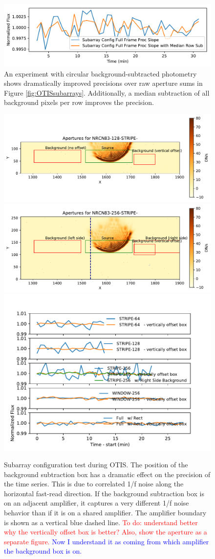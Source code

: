 \documentclass{aastex62}
\begin{document}
{\begin{figure}[!hbtp]
\centering
\includegraphics[width=.5\columnwidth]{fullframe_background_sub_compare_tser_tools.pdf}
\caption{An experiment with circular background-subtracted photometry shows dramatically improved precisions over raw aperture sums in Figure \ref{fig:OTISsubarrays}.
Additionally, a median subtraction of all background pixels per row improves the precision.}\label{fig:OTISSubConfigCircularAp}
\end{figure}

\begin{figure}[!hbtp]
\centering
\includegraphics[width=0.48\columnwidth]{apertures_for_NRCN83-128-STRIPE-72.pdf}
\includegraphics[width=0.48\columnwidth]{apertures_for_NRCN83-256-STRIPE-72.pdf}
\includegraphics[width=.48\columnwidth]{subarray_config_tser_backsub_rect.pdf}
\caption{Subarray configuration test during OTIS. The position of the background subtraction box has a dramatic effect on the precision of the time series.
This is due to correlated 1/f noise along the horizontal fast-read direction.
If the background subtraction box is on an adjacent amplifier, it captures a very different 1/f noise behavior than if it is on a shared amplifier.
The amplifier boundary is shown as a vertical blue dashed line.
\textcolor{red}{To do: understand better why the vertically offset box is better? Also, show the aperture as a separate figure.}
\textcolor{blue}{Now I understand it as coming from which amplifier the background box is on.}}\label{fig:OTISRectBacksub}
\end{figure}

}
\end{document}
